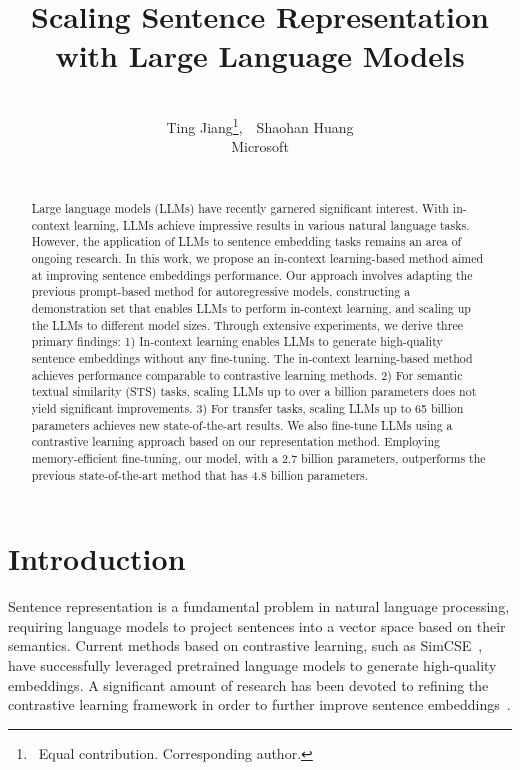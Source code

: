 \documentclass{article}
\title{Scaling Sentence Representation \\ with Large Language Models}
\author{
\vspace{-0.25in} \\
Ting Jiang\thanks{~Equal contribution.  Corresponding author.},~~{Shaohan Huang} \\
Microsoft \\
\vspace{-0.4cm}
\\}
\date{}
\begin{document}
\maketitle


\begin{abstract}
Large language models (LLMs) have recently garnered significant interest. With in-context learning, LLMs achieve impressive results in various natural language tasks. However, the application of LLMs to sentence embedding tasks remains an area of ongoing research. In this work, we propose an in-context learning-based method aimed at improving sentence embeddings performance. 
Our approach involves adapting the previous prompt-based method for autoregressive models, constructing a demonstration set that enables LLMs to perform in-context learning, and scaling up the LLMs to different model sizes.
Through extensive experiments, we derive three primary findings: 1) In-context learning enables LLMs to generate high-quality sentence embeddings without any fine-tuning. The in-context learning-based method achieves performance comparable to contrastive learning methods. 2) For semantic textual similarity (STS) tasks, scaling LLMs up to over a billion parameters does not yield significant improvements. 3) For transfer tasks, scaling LLMs up to 65 billion parameters achieves new state-of-the-art results.
We also fine-tune LLMs using a contrastive learning approach based on our representation method. Employing memory-efficient fine-tuning, our model, with a 2.7 billion parameters, outperforms the previous state-of-the-art method that has 4.8 billion parameters.

\end{abstract}

\section{Introduction}
\label{sec:intro}

Sentence representation is a fundamental problem in natural language processing, requiring language models to project sentences into a vector space based on their semantics. Current methods based on contrastive learning, such as SimCSE~\cite{gao2021simcse}, have successfully leveraged pretrained language models to generate high-quality embeddings. A significant amount of research has been devoted to refining the contrastive learning framework in order to further improve sentence embeddings~\cite{chuang2022diffcse, wu2022pcl, wu-etal-2022-infocse, cheng2023improving}.
\end{document}
